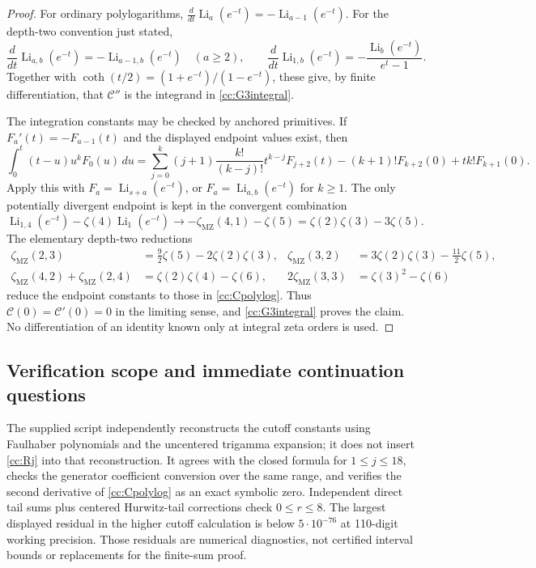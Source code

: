 \begin{proof}
For ordinary polylogarithms,
$\frac{d}{dt}\operatorname{Li}_a(e^{-t})=-\operatorname{Li}_{a-1}(e^{-t})$.
For the depth-two convention just stated,
\[
 \frac{d}{dt}\operatorname{Li}_{a,b}(e^{-t})
   =-\operatorname{Li}_{a-1,b}(e^{-t})\quad(a\ge2),\qquad
 \frac{d}{dt}\operatorname{Li}_{1,b}(e^{-t})
   =-\frac{\operatorname{Li}_b(e^{-t})}{e^t-1}.
\]
Together with $\coth(t/2)=(1+e^{-t})/(1-e^{-t})$, these give,
by finite differentiation, that $\mathcal C''$ is the integrand in
\eqref{cc:G3integral}.

The integration constants may be checked by anchored primitives.
If $F_a'(t)=-F_{a-1}(t)$ and the displayed endpoint values exist, then
\begin{equation}\label{cc:anchoredprimitive}
 \int_0^t(t-u)u^kF_0(u)\,du
 =\sum_{j=0}^k(j+1)\frac{k!}{(k-j)!}t^{k-j}F_{j+2}(t)
       -(k+1)!F_{k+2}(0)+tk!F_{k+1}(0).
\end{equation}
Apply this with $F_a=\operatorname{Li}_{s+a}(e^{-t})$, or
$F_a=\operatorname{Li}_{a,b}(e^{-t})$ for $k\ge1$.
The only potentially divergent endpoint is kept in the convergent
combination
\[
 \operatorname{Li}_{1,4}(e^{-t})-\zeta(4)\operatorname{Li}_1(e^{-t})
 \longrightarrow -\zeta_{\mathrm{MZ}}(4,1)-\zeta(5)
                 =\zeta(2)\zeta(3)-3\zeta(5).
\]
The elementary depth-two reductions
\begin{align*}
 \zeta_{\mathrm{MZ}}(2,3)&=\tfrac92\zeta(5)-2\zeta(2)\zeta(3),&
 \zeta_{\mathrm{MZ}}(3,2)&=3\zeta(2)\zeta(3)-\tfrac{11}{2}\zeta(5),\\
 \zeta_{\mathrm{MZ}}(4,2)+\zeta_{\mathrm{MZ}}(2,4)&=\zeta(2)\zeta(4)-\zeta(6),&
 2\zeta_{\mathrm{MZ}}(3,3)&=\zeta(3)^2-\zeta(6)
\end{align*}
reduce the endpoint constants to those in \eqref{cc:Cpolylog}.
Thus $\mathcal C(0)=\mathcal C'(0)=0$ in the limiting sense,
and \eqref{cc:G3integral} proves the claim.  No differentiation of
an identity known only at integral zeta orders is used.
\end{proof}

\subsection{Verification scope and immediate continuation questions}

The supplied script independently reconstructs the cutoff constants
using Faulhaber polynomials and the uncentered trigamma expansion; it
does not insert \eqref{cc:Rj} into that reconstruction.  It agrees
with the closed formula for $1\le j\le18$, checks the generator
coefficient conversion over the same range, and verifies the second
derivative of \eqref{cc:Cpolylog} as an exact symbolic zero.
Independent direct tail sums plus centered Hurwitz-tail corrections
check $0\le r\le8$.  The largest displayed residual in the higher
cutoff calculation is below $5\cdot10^{-76}$ at 110-digit working
precision.  Those residuals are numerical diagnostics, not certified
interval bounds or replacements for the finite-sum proof.

